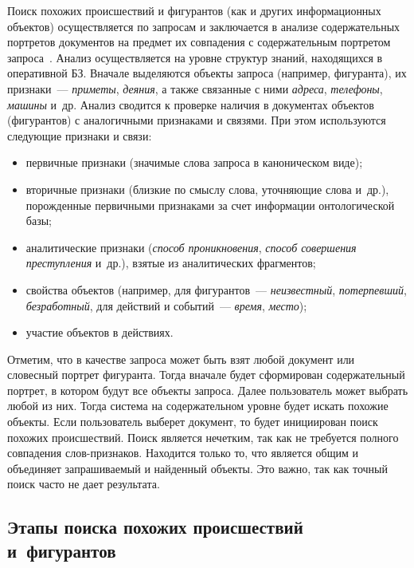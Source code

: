 \begin{multicols}{2}
    Поиск похожих происшествий и фигурантов (как и других 
информационных объектов) осуществляется по запросам и заключается в 
анализе содержательных портретов документов на предмет их совпадения с 
содержательным портретом запроса~\cite{3sha, 8sha, 9sha}. Анализ 
осуществляется на уровне структур знаний, находящихся в оперативной 
БЗ. Вначале выделяются объекты запроса (например, фигуранта), их 
признаки~--- \textit{приметы}, \textit{деяния}, а также связанные с ними 
\textit{адреса}, \textit{телефоны}, \textit{машины} и~др. Анализ сводится к 
проверке наличия в документах объектов (фигурантов) с аналогичными 
признаками и связями. При этом используются следующие признаки и связи:
    \begin{itemize}
    \item первичные признаки (значимые слова запроса в каноническом виде);
    \item вторичные признаки (близкие по смыслу слова, уточняющие слова 
и~др.), порожденные первичными признаками за счет информации 
онтологической базы;
    \item аналитические признаки (\textit{способ проникновения}, \textit{способ 
совершения преступления} и~др.), взятые из аналитических фрагментов;
    \item свойства объектов (например, для фигурантов~--- 
\textit{неизвестный}, \textit{потерпевший}, \textit{безработный}, для действий 
и событий~--- \textit{время}, \textit{место});
    \item участие объектов в действиях.
    \end{itemize}
    
    Отметим, что в качестве запроса может быть взят любой документ или 
словесный портрет фигуранта. Тогда вначале будет сформирован 
содержательный портрет, в котором будут все объекты запроса. Далее 
пользователь может выбрать любой из них. Тогда система на содержательном 
уровне будет искать похожие объекты. Если пользователь выберет документ, то 
будет инициирован поиск похожих происшествий. Поиск является нечетким, 
так как не требуется полного совпадения слов-признаков. Находится только то, 
что является общим и объединяет запрашиваемый и найденный объекты. Это 
важно, так как точный поиск часто не дает результата.
    
\subsection*{Этапы поиска похожих происшествий и~фигурантов}
    

\end{multicols}
